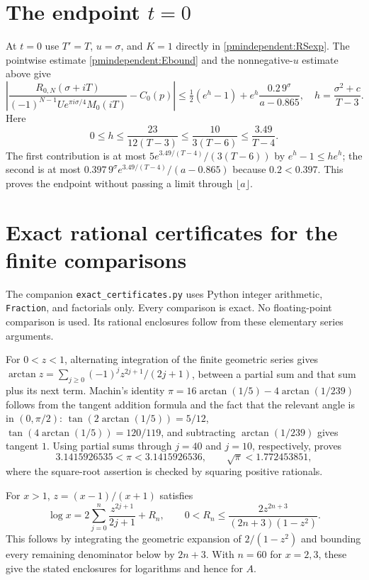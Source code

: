 \documentclass[11pt]{article}
\begin{document}
\section{The endpoint $t=0$}

At $t=0$ use $T'=T$, $u=\sigma$, and $K=1$ directly in
\eqref{pmindependent:RSexp}. The pointwise estimate \eqref{pmindependent:Ebound} and the
nonnegative-$u$ estimate above give
\[
 \left|\frac{R_{0,N}(\sigma+iT)}
 {(-1)^{N-1}Ue^{\pi i\sigma/4}M_0(iT)}-C_0(p)\right|
 \le\tfrac12(e^h-1)+e^h\frac{0.2\,9^\sigma}{a-0.865},
 \quad h=\frac{\sigma^2+c}{T-3}.
\]
Here
\[
 0\le h\le\frac{23}{12(T-3)}
 \le\frac{10}{3(T-6)}\le\frac{3.49}{T-4}.
\]
The first contribution is at most
$5e^{3.49/(T-4)}/(3(T-6))$ by $e^h-1\le he^h$;
the second is at most
$0.397\,9^\sigma e^{3.49/(T-4)}/(a-0.865)$ because $0.2<0.397$.
This proves the endpoint without passing a limit through $\lfloor a\rfloor$.

\section{Exact rational certificates for the finite comparisons}

The companion \texttt{exact\_certificates.py} uses Python integer
arithmetic, \texttt{Fraction}, and factorials only. Every comparison
is exact. No floating-point comparison is used. Its rational
enclosures follow from these elementary series arguments.

For $0<z<1$, alternating integration of the finite geometric series
gives
$\arctan z=\sum_{j\ge0}(-1)^jz^{2j+1}/(2j+1)$,
between a partial sum and that sum plus its next term. Machin's
identity $\pi=16\arctan(1/5)-4\arctan(1/239)$ follows from
the tangent addition formula and the fact that the relevant angle
is in $(0,\pi/2)$: $\tan(2\arctan(1/5))=5/12$,
$\tan(4\arctan(1/5))=120/119$, and subtracting
$\arctan(1/239)$ gives tangent $1$. Using partial sums through
$j=40$ and $j=10$, respectively, proves
\[
 3.1415926535<\pi<3.1415926536,
 \qquad \sqrt\pi<1.772453851,
\]
where the square-root assertion is checked by squaring positive
rationals.

For $x>1$, $z=(x-1)/(x+1)$ satisfies
\[
 \log x=2\sum_{j=0}^n\frac{z^{2j+1}}{2j+1}+R_n,
 \qquad 0<R_n\le\frac{2z^{2n+3}}{(2n+3)(1-z^2)}.
\]
This follows by integrating the geometric expansion of
$2/(1-z^2)$ and bounding every remaining denominator below by
$2n+3$. With $n=60$ for $x=2,3$, these give the stated enclosures
for logarithms and hence for $A$.
\end{document}
